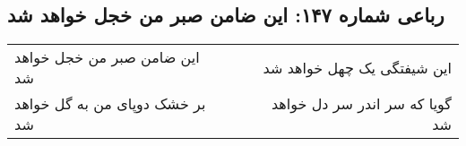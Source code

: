 \begin{center}
\section*{رباعی شماره ۱۴۷: این ضامن صبر من خجل خواهد شد}
\label{sec:sh147}
\begin{longtable}{l p{0.5cm} r}
این ضامن صبر من خجل خواهد شد
&&
این شیفتگی یک چهل خواهد شد
\\
بر خشک دوپای من به گل خواهد شد
&&
گویا که سر اندر سر دل خواهد شد
\\
\end{longtable}
\end{center}
